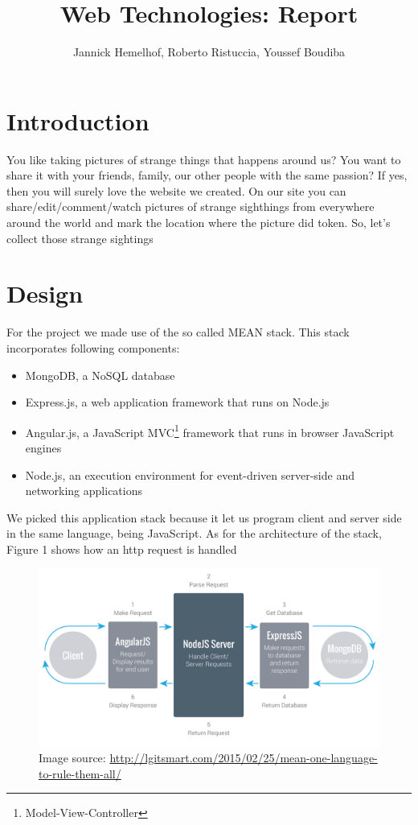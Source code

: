 \documentclass{article}
\title{Web Technologies: Report}
\author{Jannick Hemelhof, Roberto Ristuccia, Youssef Boudiba}
\begin{document}
\maketitle
\newpage
\tableofcontents
\newpage
{}

\section{Introduction}
You like taking pictures of strange things that happens around us? You want to share it with your friends, family, our other people with the same passion? If yes, then you will surely love the website we created. On our site you can share/edit/comment/watch pictures of strange sighthings from everywhere around the world and mark the location where the picture did token. So, let's collect those strange sightings

\section{Design}
For the project we made use of the so called MEAN stack. This stack incorporates following components:
\begin{itemize}
\item MongoDB, a NoSQL database
\item Express.js, a web application framework that runs on Node.js
\item Angular.js, a JavaScript MVC\footnote{Model-View-Controller} framework that runs in browser JavaScript engines
\item Node.js, an execution environment for event-driven server-side and networking applications
\end{itemize}
We picked this application stack because it let us program client and server side in the same language, being JavaScript. 
As for the architecture of the stack, Figure 1 shows how an http request is handled
\begin{figure}[hb]%
  \centering
  \includegraphics[width=15cm]{architecture}
  \caption{Image source: \url{http://lgitsmart.com/2015/02/25/mean-one-language-to-rule-them-all/}}
  \label{fig:test}
\end{figure}
\end{document}
